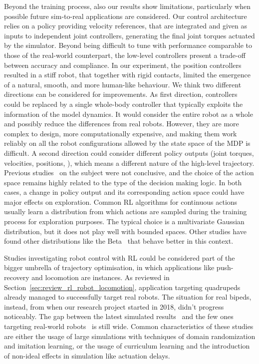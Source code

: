 Beyond the training process, also our results show limitations, particularly when possible future sim-to-real applications are considered.
Our control architecture relies on a policy providing velocity references, that are integrated and given as inputs to independent \pid joint controllers, generating the final joint torques actuated by the simulator.
Beyond being difficult to tune with performance comparable to those of the real-world counterpart, the low-level \pid controllers present a trade-off between accuracy and compliance.
In our experiment, the position \pid controllers resulted in a stiff robot, that together with rigid contacts, limited the emergence of a natural, smooth, and more human-like behaviour.
We think two different directions can be considered for improvements.
As first direction, \pid controllers could be replaced by a single whole-body controller that typically exploits the information of the model dynamics.
It would consider the entire robot as a whole and possibly reduce the differences from real robots.
However, they are more complex to design, more computationally expensive, and making them work reliably on all the robot configurations allowed by the state space of the \ac{MDP} is difficult.
A second direction could consider different policy outputs (joint torques, velocities, positions, \etc), which means a different nature of the high-level trajectory.
Previous studies~\parencite{peng_learning_2017,reda_learning_2020} on the subject were not conclusive, and the choice of the action space remains highly related to the type of the decision making logic.
In both cases, a change in policy output and its corresponding action space could have major effects on exploration.
Common \ac{RL} algorithms for continuous actions usually learn a distribution from which actions are sampled during the training process for exploration purposes.
The typical choice is a multivariate Gaussian distribution, but it does not play well with bounded spaces.
Other studies have found other distributions like the Beta~\parencite{chou_improving_2017} that behave better in this context.

Studies investigating robot control with \ac{RL} could be considered part of the bigger umbrella of trajectory optimisation, in which applications like push-recovery and locomotion are instances.
As reviewed in Section~\ref{sec:review_rl_robot_locomotion}, application targeting quadrupeds already managed to successfully target real robots.
The situation for real bipeds, instead, from when our research project started in 2018, didn't progress noticeably.
The gap between the latest simulated results~\parencite{peng_ase_2022} and the few ones targeting real-world robots~\parencite{castillo_robust_2021,li_reinforcement_2021,rodriguez_deepwalk_2021,bloesch_towards_2022} is still wide.
Common characteristics of these studies are either the usage of large simulations with techniques of domain randomization and imitation learning, or the usage of curriculum learning and the introduction of non-ideal effects in simulation like actuation delays.

